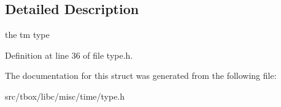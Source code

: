 \subsection{Detailed Description}
the tm type 

Definition at line 36 of file type.\-h.



The documentation for this struct was generated from the following file\-:\begin{DoxyCompactItemize}
\item 
src/tbox/libc/misc/time/type.\-h\end{DoxyCompactItemize}
